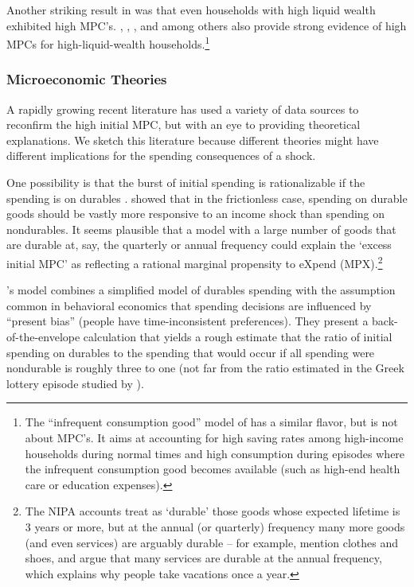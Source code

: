 \documentclass[\econtexRoot/HAFiscal]{subfiles}
\begin{document}

Another striking result in \cite{fagereng_mpc_2021} was that even households with high liquid wealth exhibited high MPC's.  \cite{boehm2025fivefacts}, \cite{graham2024mental}, \cite{crawley2023MicroMacro}, and \cite{kueng2018excess} among others also provide strong evidence of high MPCs for high-liquid-wealth households.\footnote{The ``infrequent consumption good'' model of \cite{melcangiStock} has a similar flavor, but is not about MPC's.  It aims at accounting for high saving rates among high-income households during normal times and high consumption during episodes where the infrequent consumption good becomes available (such as high-end health care or education expenses).}

\hypertarget{microeconomic-theories}{}
\subsubsection{Microeconomic Theories}
A rapidly growing recent literature has used a variety of data sources to reconfirm the high initial MPC, but with an eye to providing theoretical explanations. We sketch this literature because different theories might have different implications for the spending consequences of a shock.


One possibility is that the burst of initial spending is rationalizable if the spending is on durables \citep{bcShocksStocks}.  
\cite{mankiw:durgoods} showed that in the frictionless case, spending on durable goods should be vastly more responsive to an income shock than spending on nondurables. 
It seems plausible that a model with a large number of goods that are durable at, say, the quarterly or annual frequency could explain the `excess initial MPC' as reflecting a rational marginal propensity to eXpend (MPX).\footnote{The NIPA accounts treat as `durable' those goods whose expected lifetime is 3 years or more, but at the annual (or quarterly) frequency many more goods (and even services) are arguably durable -- for example, \cite{bdTimeSeriesC} mention clothes and shoes, and \cite{hkpMemorable} argue that many services are durable at the annual frequency, which explains why people take vacations once a year.}

\cite{lmmPresentBias}'s model combines a simplified model of durables spending with the assumption common in behavioral economics that spending decisions are influenced by ``present bias'' (people have time-inconsistent preferences).  They present a back-of-the-envelope calculation that yields a rough estimate that the ratio of initial spending on durables to the spending that would occur if all spending were nondurable is roughly three to one (not far from the ratio estimated in the Greek lottery episode studied by \cite{kotsogiannisMPCs}).
\end{document}
